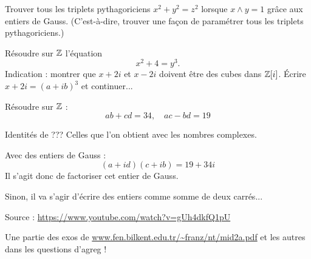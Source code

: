 \begin{exo}
Trouver tous les triplets pythagoriciens $x^2+y^2=z^2$ lorsque $x\wedge y=1$ grâce aux entiers de Gauss. (C'est-à-dire, trouver une façon de paramétrer tous les triplets pythagoriciens.)
\end{exo}

\begin{exo}
Résoudre sur $\mathbb Z$ l'équation
\[ x^2+4=y^3.\]
Indication : montrer que $x+2i$ et $x-2i$ doivent être des cubes dans $\mathbb Z[i]$. Écrire $x+2i=(a+ib)^3$ et continuer...
\end{exo}

\begin{exo}
Résoudre sur $\mathbb Z$ :
\[ ab+cd = 34, \quad ac-bd=19\]
\begin{hint}
Identités de ??? Celles que l'on obtient avec les nombres complexes.
\end{hint}
\begin{sol}
Avec des entiers de Gauss : 
\[ (a+id)(c+ib) = 19+34i \]
Il s'agit donc de factoriser cet entier de Gauss.


Sinon, il va s'agir d'écrire des entiers comme somme de deux carrés...

Source : \url{https://www.youtube.com/watch?v=gUh4dkfQ1pU}
\end{sol}
\end{exo}


Une partie des exos de \url{www.fen.bilkent.edu.tr/~franz/nt/mid2a.pdf} et les autres dans les questions d'agreg !

\begin{exo}
\begin{hint}
\end{hint}
\begin{sol}
\end{sol}
\end{exo}


